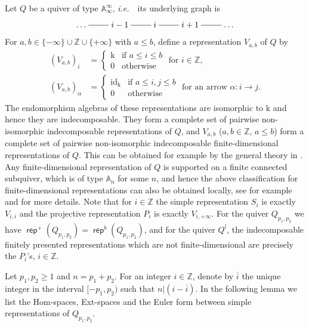 \documentclass[reqno,12pt,a4paper]{amsart}
\theoremstyle{remark}
\theoremstyle{definition}
\newcommand{\ie}{{\em i.e.~}\ }
\newcommand{\opname}[1]{\operatorname{\mathsf{#1}}}
\newcommand{\rep}{\opname{rep}\nolimits}
\newcommand{\fk}{{\mathrm k}}
\numberwithin{equation}{section}
\begin{document}
Let $Q$ be a quiver of type $\mathbb{A}_\infty^\infty$, \ie its underlying graph is
\[\xymatrix{\ldots\ar@{-}[r]&i-1\ar@{-}[r]&i\ar@{-}[r]&i+1\ar@{-}[r]&\ldots}\]
For $a,b\in\{-\infty\}\cup\mathbb{Z}\cup\{+\infty\}$ with $a\leq b$, define a representation $V_{a,b}$ of $Q$ by
\begin{align*}(V_{a,b})_i&=\begin{cases} \fk & \text{if } a\leq i\leq b\\ 0 & \text{otherwise}\end{cases} \text{ for }i\in\mathbb{Z},\\
(V_{a,b})_\alpha&=\begin{cases} \mathrm{id}_{\fk} &\text{if } a\leq i,j\leq b\\ 0 & \text{otherwise}\end{cases} \text{ for an arrow }\alpha\colon i\to j.
\end{align*}
The endomorphism algebras of these representations are isomorphic to $\fk$ and hence they are indecomposable. They form a complete set of pairwise non-isomorphic indecomposable representations of $Q$, and $V_{a,b}$ ($a,b\in\mathbb{Z}$, $a\leq b$) form a complete set of pairwise non-isomorphic indecomposable finite-dimensional representations of $Q$. This can be obtained for example by the general theory in \cite[Section 5]{BautistaLiuPaquette13}.  Any finite-dimensional representation of $Q$ is supported on a finite connected subquiver, which is of type $\mathbb{A}_n$ for some $n$, and hence the above classification for finite-dimensional representations can also be obtained locally, see for example \cite{HouYe2006} and \cite{HouYe2008} for more details. Note that for $i\in\mathbb{Z}$ the simple representation $S_i$ is exactly $V_{i,i}$ and the projective representation $P_i$ is exactly $V_{i,+\infty}$. For the quiver $Q_{p_1,p_2}$ we have $\rep^+(Q_{p_1,p_2})=\rep^b(Q_{p_1,p_2})$, and for the quiver $Q^l$, the indecomposable finitely presented representations which are not finite-dimensional are precisely the $P_i$'s, $i\in\mathbb{Z}$.

Let $p_1,p_2\geq 1$ and $n=p_1+p_2$. For an integer $i\in \mathbb{Z}$, denote by $\overline{i}$ the unique integer in the interval $[-p_1,p_2)$ such that $n|(i-\overline{i})$.
In the following lemma we list the Hom-spaces, Ext-spaces and the Euler form between simple representations of $Q_{p_1,p_2}$.
\end{document}
